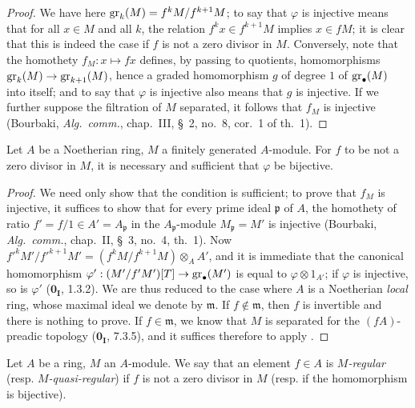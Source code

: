 \begin{proof}
We have here $\operatorname{gr}_k(M)=f^kM/f^{k+1}M$;
to say that $\varphi$ is injective means that for all $x\in M$ and all $k$, the relation $f^kx\in f^{k+1}M$ implies $x\in fM$;
it is clear that this is indeed the case if $f$ is not a zero divisor in $M$.
Conversely, note that the homothety $f_M:x\mapsto fx$ defines, by passing to quotients, homomorphisms $\operatorname{gr}_k(M)\to\operatorname{gr}_{k+1}(M)$, hence a graded homomorphism $g$ of degree $1$ of $\operatorname{gr}_\bullet(M)$ into itself;
and to say that $\varphi$ is injective also means that $g$ is injective.
If we further suppose the filtration of $M$ separated, it follows that $f_M$ is injective
(Bourbaki, \emph{Alg.~comm.}, chap.~III, \S~2, no.~8, cor.~1 of th.~1).
\end{proof}

\begin{corollary}[15.1.3]
\label{0.15.1.3}
Let $A$ be a Noetherian ring, $M$ a finitely generated $A$-module.
For $f$ to be not a zero divisor in $M$, it is necessary and sufficient that $\varphi$ be bijective.
\end{corollary}

\begin{proof}
We need only show that the condition is sufficient;
to prove that $f_M$ is injective, it suffices to show that for every prime ideal $\mathfrak{p}$ of $A$, the homothety of ratio $f'=f/1\in A'=A_\mathfrak{p}$ in the $A_\mathfrak{p}$-module $M_\mathfrak{p}=M'$ is injective
(Bourbaki, \emph{Alg.~comm.}, chap.~II, \S~3, no.~4, th.~1).
Now $f'^kM'/f'^{k+1}M'=(f^kM/f^{k+1}M)\otimes_A A'$, and it is immediate that the canonical homomorphism $\varphi':(M'/f'M')[T]\to\operatorname{gr}_\bullet(M')$ is equal to $\varphi\otimes 1_{A'}$;
if $\varphi$ is injective, so is $\varphi'$ ($\mathbf{0_I}$, 1.3.2).
We are thus reduced to the case where $A$ is a Noetherian \emph{local} ring, whose maximal ideal we denote by $\mathfrak{m}$.
If $f\notin\mathfrak{m}$, then $f$ is invertible and there is nothing to prove.
If $f\in\mathfrak{m}$, we know that $M$ is separated for the $(fA)$-preadic topology ($\mathbf{0_I}$, 7.3.5), and it suffices therefore to apply .
\end{proof}

\begin{definition}[15.1.4]
\label{0.15.1.4}
Let $A$ be a ring, $M$ an $A$-module.
We say that an element $f\in A$ is \emph{$M$-regular} (resp. \emph{$M$-quasi-regular}) if $f$ is not a zero divisor in $M$ (resp. if the homomorphism  is bijective).
\end{definition}

